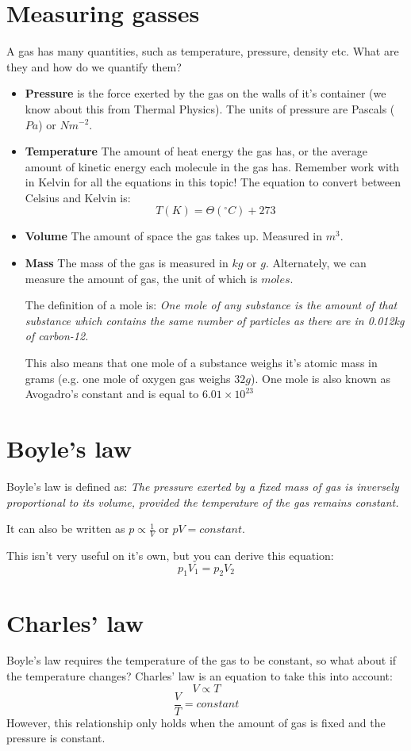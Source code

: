 \documentclass{article}
\begin{document}
\section*{Measuring gasses}
A gas has many quantities, such as temperature, pressure, density etc. What are they and how do we quantify them?

\begin{itemize}
	\item \textbf{Pressure} is the force exerted by the gas on the walls of it's container (we know about this from Thermal Physics). The units of pressure are Pascals ($Pa$) or $Nm^{-2}$.
	\item \textbf{Temperature} The amount of heat energy the gas has, or the average amount of kinetic energy each molecule in the gas has. Remember work with in Kelvin for all the equations in this topic! The equation to convert between Celsius and Kelvin is: 
	\[
		T(K) = \Theta(^\circ C) + 273
	\]
	\item \textbf{Volume} The amount of space the gas takes up. Measured in $m^3$.
	\item \textbf{Mass} The mass of the gas is measured in $kg$ or $g$. Alternately, we can measure the amount of gas, the unit of which is $moles$.
	
	The definition of a mole is: \textit{One mole of any substance is the amount of that substance which contains the same number of particles as there are in 0.012kg of carbon-12.}
	
	This also means that one mole of a substance weighs it's atomic mass in grams (e.g. one mole of oxygen gas weighs $32g$). One mole is also known as Avogadro's constant and is equal to $6.01 \times 10^{23}$
\end{itemize}

\section*{Boyle's law}
Boyle's law is defined as: \textit{The pressure exerted by a fixed mass of gas is inversely proportional to its volume, provided the temperature of the gas remains constant.}

It can also be written as $p \propto \frac{1}{V}$ or $pV = constant$.

This isn't very useful on it's own, but you can derive this equation:
\[
	p_1V_1 = p_2V_2
\]

\section*{Charles' law}
Boyle's law requires the temperature of the gas to be constant, so what about if the temperature changes? Charles' law is an equation to take this into account:
\[
	V \propto T
\]
\[
	\frac{V}{T} = constant
\]
However, this relationship only holds when the amount of gas is fixed and the pressure is constant.
\end{document}
